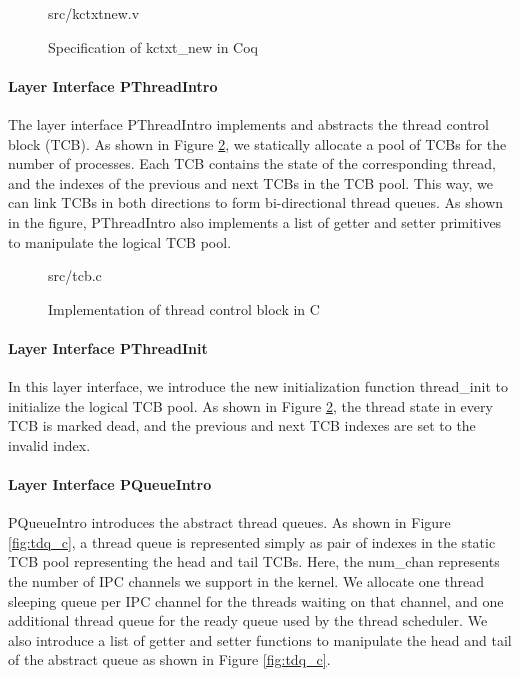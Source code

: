 \begin{figure}
	 {src/kctxtnew.v}
	\caption{Specification of \textsf{kctxt\_new} in Coq}
	\label{fig:kctxtnew_v}
\end{figure}


\paragraph{Layer Interface PThreadIntro}

The layer interface PThreadIntro implements and abstracts the thread control block (TCB).
As shown in Figure \ref{fig:tcb_c}, we statically allocate a pool of TCBs for the number of
processes. Each TCB contains the state of the corresponding thread, and the indexes of
the previous and next TCBs in the TCB pool. This way, we can link TCBs in both directions
to form bi-directional thread queues. As shown in the figure, PThreadIntro also implements
a list of getter and setter primitives to manipulate the logical TCB pool.

\begin{figure}
	 {src/tcb.c}
	\caption{Implementation of thread control block in C}
	\label{fig:tcb_c}
\end{figure}

\paragraph{Layer Interface PThreadInit}

In this layer interface, we introduce the new initialization function \textsf{thread\_init} to initialize
the logical TCB pool. As shown in Figure \ref{fig:tcb_c}, the thread state in every TCB is marked
dead, and the previous and next TCB indexes are set to the invalid index.

\paragraph{Layer Interface PQueueIntro}

PQueueIntro introduces the abstract thread queues. As shown in Figure \ref{fig:tdq_c}, a thread queue
is represented simply as pair of indexes in the static TCB pool representing the head and tail TCBs.
Here, the \textsf{num\_chan} represents the number of IPC channels we support in the kernel.
We allocate one thread sleeping queue per IPC channel for the threads waiting on that channel,
and one additional thread queue for the ready queue used by the thread scheduler.
We also introduce a list of getter and setter functions to manipulate the head and tail of the abstract
queue as shown in Figure \ref{fig:tdq_c}.

